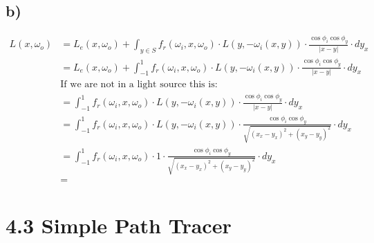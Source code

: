 \documentclass[a4paper]{scrartcl}
\begin{document}
\subsection*{b)}

\begin{align*}
  L(x, \omega_o) &= L_e(x, \omega_o) + \int_{y \in S} f_r(\omega_i, x, \omega_o) \cdot L(y, -\omega_i(x,y)) \cdot \frac{\cos \phi_i \cos \phi_y}{\lvert x - y \rvert} \cdot d y_x \\
  &= L_e(x, \omega_o) + \int_{-1}^{1} f_r(\omega_i, x, \omega_o) \cdot L(y, -\omega_i(x,y)) \cdot \frac{\cos \phi_i \cos \phi_y}{\lvert x - y \rvert} \cdot d y_x \\
  & \text{If we are not in a light source this is: } \\
  &= \int_{-1}^{1} f_r(\omega_i, x, \omega_o) \cdot L(y, -\omega_i(x,y)) \cdot \frac{\cos \phi_i \cos \phi_y}{\lvert x - y \rvert} \cdot d y_x \\
  &= \int_{-1}^{1} f_r(\omega_i, x, \omega_o) \cdot L(y, -\omega_i(x,y)) \cdot \frac{\cos \phi_i \cos \phi_y}{\sqrt{(x_x - y_x)^2 + (x_y - y_y)^2}} \cdot d y_x \\
  &= \int_{-1}^{1} f_r(\omega_i, x, \omega_o) \cdot 1 \cdot \frac{\cos \phi_i \cos \phi_y}{\sqrt{(x_x - y_x)^2 + (x_y - y_y)^2}} \cdot d y_x \\
  &= 
\end{align*}


\section*{4.3 Simple Path Tracer}
\end{document}
